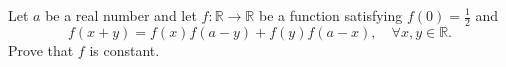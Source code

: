 Let $a$ be a real number and let $f : \mathbb{R}\rightarrow \mathbb{R}$ be a function satisfying $f(0)=\frac{1}{2}$ and\[f(x+y)=f(x)f(a-y)+f(y)f(a-x), \quad \forall x,y \in \mathbb{R}.\]Prove that $f$ is constant.